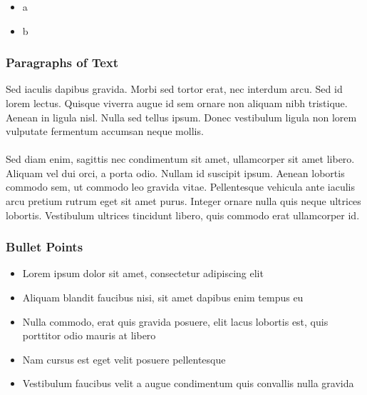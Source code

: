 \documentclass[professionalfonts]{beamer}
\begin{document}
\begin{frame}
\frametitle{}
\begin{itemize}
\item a
\item b
\end{itemize}
\end{frame}



\begin{frame}
\frametitle{Paragraphs of Text}
Sed iaculis dapibus gravida. Morbi sed tortor erat, nec interdum arcu. Sed id lorem lectus. Quisque viverra augue id sem ornare non aliquam nibh tristique. Aenean in ligula nisl. Nulla sed tellus ipsum. Donec vestibulum ligula non lorem vulputate fermentum accumsan neque mollis.\\~\\

Sed diam enim, sagittis nec condimentum sit amet, ullamcorper sit amet libero. Aliquam vel dui orci, a porta odio. Nullam id suscipit ipsum. Aenean lobortis commodo sem, ut commodo leo gravida vitae. Pellentesque vehicula ante iaculis arcu pretium rutrum eget sit amet purus. Integer ornare nulla quis neque ultrices lobortis. Vestibulum ultrices tincidunt libero, quis commodo erat ullamcorper id.
\end{frame}


\begin{frame}
\frametitle{Bullet Points}
\begin{itemize}
\item Lorem ipsum dolor sit amet, consectetur adipiscing elit
\item Aliquam blandit faucibus nisi, sit amet dapibus enim tempus eu
\item Nulla commodo, erat quis gravida posuere, elit lacus lobortis est, quis porttitor odio mauris at libero
\item Nam cursus est eget velit posuere pellentesque
\item Vestibulum faucibus velit a augue condimentum quis convallis nulla gravida
\end{itemize}
\end{frame}
\end{document}
